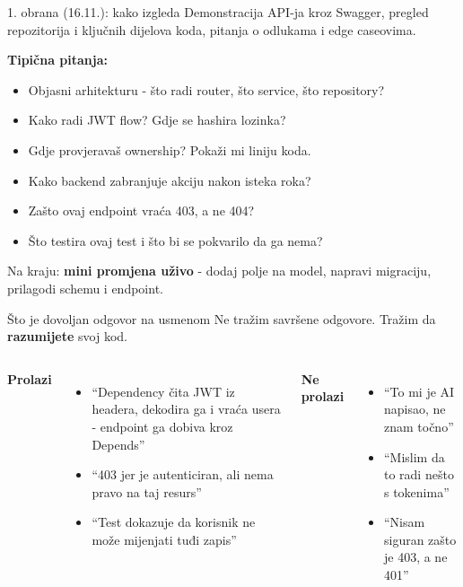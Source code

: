 
\begin{frame}{1. obrana (16.11.): kako izgleda}
Demonstracija API-ja kroz Swagger, pregled repozitorija i ključnih dijelova koda, pitanja o odlukama i edge caseovima.

\vspace{0.4em}
\textbf{Tipična pitanja:}
\begin{itemize}
  \item Objasni arhitekturu - što radi router, što service, što repository?
  \item Kako radi JWT flow? Gdje se hashira lozinka?
  \item Gdje provjeravaš ownership? Pokaži mi liniju koda.
  \item Kako backend zabranjuje akciju nakon isteka roka?
  \item Zašto ovaj endpoint vraća 403, a ne 404?
  \item Što testira ovaj test i što bi se pokvarilo da ga nema?
\end{itemize}

\vspace{0.4em}
Na kraju: \textbf{mini promjena uživo} - dodaj polje na model, napravi migraciju, prilagodi schemu i endpoint.
\end{frame}

\begin{frame}{Što je dovoljan odgovor na usmenom}
Ne tražim savršene odgovore. Tražim da \textbf{razumijete} svoj kod.

\vspace{0.6em}
\begin{columns}[T]
\textbf{Prolazi}
\begin{itemize}
  \item \enquote{Dependency čita JWT iz headera, dekodira ga i vraća usera - endpoint ga dobiva kroz Depends}
  \item \enquote{403 jer je autenticiran, ali nema pravo na taj resurs}
  \item \enquote{Test dokazuje da korisnik ne može mijenjati tuđi zapis}
\end{itemize}

\textbf{Ne prolazi}
\begin{itemize}
  \item \enquote{To mi je AI napisao, ne znam točno}
  \item \enquote{Mislim da to radi nešto s tokenima}
  \item \enquote{Nisam siguran zašto je 403, a ne 401}
\end{itemize}
\end{columns}
\end{frame}

